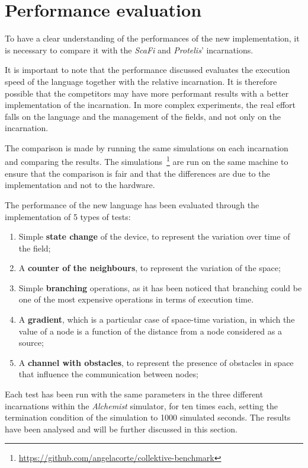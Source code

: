 \section{Performance evaluation}
\label{sec:performance-/-comparison}
To have a clear understanding of the performances of the new implementation, it is necessary to compare it with the
\emph{ScaFi} and \emph{Protelis}' incarnations.

It is important to note that the performance discussed evaluates the execution speed of the language together with
the relative incarnation.
It is therefore possible that the competitors may have more performant results with a better implementation of the incarnation.
In more complex experiments, the real effort falls on the language and the management of the fields, and not only on the incarnation.

The comparison is made by running the same simulations on each incarnation and comparing the results.
The simulations~\footnote{\url{https://github.com/angelacorte/collektive-benchmark}} are run on the same machine to
ensure that the comparison is fair and that the differences are due to the implementation and not to the hardware.

The performance of the new language has been evaluated through the implementation of 5 types of tests:
\begin{enumerate}
    \item Simple \textbf{state change} of the device, to represent the variation over time of the field;
    \item A \textbf{counter of the neighbours}, to represent the variation of the space;
    \item Simple \textbf{branching} operations, as it has been noticed that branching could be one of the most expensive operations in terms of execution time.
    \item A \textbf{gradient}, which is a particular case of space-time variation, in which the value of a node is a
        function of the distance from a node considered as a source;
    \item A \textbf{channel with obstacles}, to represent the presence of obstacles in space that influence the communication between nodes;
\end{enumerate}

Each test has been run with the same parameters in the three different incarnations within the \emph{Alchemist} simulator,
for ten times each, setting the termination condition of the simulation to 1000 simulated seconds.
The results have been analysed and will be further discussed in this section.

